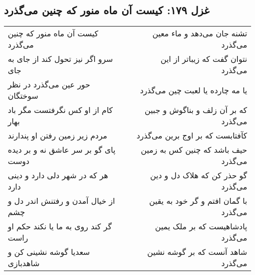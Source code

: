 \begin{center}
\section*{غزل ۱۷۹: کیست آن ماه منور که چنین می‌گذرد}
\label{sec:179}
\begin{longtable}{l p{0.5cm} r}
کیست آن ماه منور که چنین می‌گذرد
&&
تشنه جان می‌دهد و ماء معین می‌گذرد
\\
سرو اگر نیز تحول کند از جای به جای
&&
نتوان گفت که زیباتر از این می‌گذرد
\\
حور عین می‌گذرد در نظر سوختگان
&&
یا مه چارده یا لعبت چین می‌گذرد
\\
کام از او کس نگرفتست مگر باد بهار
&&
که بر آن زلف و بناگوش و جبین می‌گذرد
\\
مردم زیر زمین رفتن او پندارند
&&
کآفتابست که بر اوج برین می‌گذرد
\\
پای گو بر سر عاشق نه و بر دیده دوست
&&
حیف باشد که چنین کس به زمین می‌گذرد
\\
هر که در شهر دلی دارد و دینی دارد
&&
گو حذر کن که هلاک دل و دین می‌گذرد
\\
از خیال آمدن و رفتنش اندر دل و چشم
&&
با گمان افتم و گر خود به یقین می‌گذرد
\\
گر کند روی به ما یا نکند حکم او راست
&&
پادشاهیست که بر ملک یمین می‌گذرد
\\
سعدیا گوشه نشینی کن و شاهدبازی
&&
شاهد آنست که بر گوشه نشین می‌گذرد
\\
\end{longtable}
\end{center}
